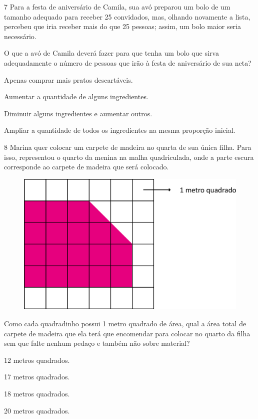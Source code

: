 \pagebreak
\num{7} Para a festa de aniversário de Camila, sua avó preparou um bolo de um tamanho adequado para receber 25 convidados, mas, olhando novamente a lista, percebeu que iria receber mais do que 25 pessoas; assim, um bolo maior seria necessário.

O que a avó de Camila deverá fazer para que tenha um bolo que sirva adequadamente o número de pessoas que irão à festa de aniversário de sua neta?

\begin{escolha}
\item
  Apenas comprar mais pratos descartáveis.
\item
  Aumentar a quantidade de alguns ingredientes.
\item
  Diminuir alguns ingredientes e aumentar outros.
\item
  Ampliar a quantidade de todos os ingredientes na mesma proporção inicial.
\end{escolha}


\num{8} Marina quer colocar um carpete de madeira no quarta de sua única filha.
Para isso, representou o quarto da menina na malha quadriculada, onde a parte escura corresponde ao carpete de madeira que será
colocado.

\begin{figure}[htpb!]
\centering
\includegraphics[width=.5\textwidth]{./media/image108.png}
\end{figure}

Como cada quadradinho possui 1 metro quadrado de área, qual a área total de carpete de madeira que ela terá que encomendar para colocar no quarto da filha sem que falte nenhum pedaço e também não sobre material?

\begin{multicols}{2}
\begin{escolha}
\item
  12 metros quadrados.
\item
  17 metros quadrados.
\item
  18 metros quadrados.
\item
  20 metros quadrados.
\end{escolha}
\end{multicols}

